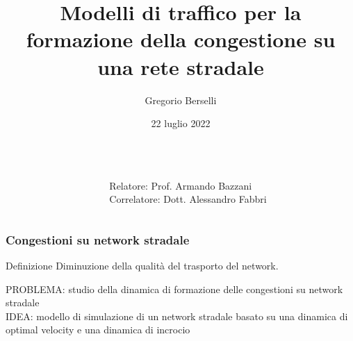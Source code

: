 \documentclass[
	11pt, %
]{beamer}
\title[]{Modelli di traffico per la formazione della congestione su una rete stradale} %
\author[Gregorio Berselli]{Gregorio Berselli} %
\institute[UniBO]{Laurea in Fisica \\ \smallskip Universit\`a di Bologna} %
\date[22 luglio 2022]{22 luglio 2022} %
\begin{document}

\begin{frame}
	\titlepage %
	\begin{columns}[c]
		\begin{column}{0.55\textwidth}
			
		\end{column}
		\begin{column}{0.45\textwidth}
			\raggedleft
			\scriptsize
			Relatore: Prof. Armando Bazzani \\ \smallskip
			Correlatore: Dott. Alessandro Fabbri
		\end{column}
	\end{columns}
\end{frame}


\begin{frame}
	\frametitle{Congestioni su network stradale}
	\begin{block}{Definizione}
		Diminuzione della qualit\`a del trasporto del network.
	\end{block}
	\vspace{10mm}
	PROBLEMA: studio della dinamica di formazione delle congestioni su network stradale\\ \smallskip
	IDEA: modello di simulazione di un network stradale basato su una dinamica di optimal velocity e una dinamica di incrocio
\end{frame}
\end{document}
